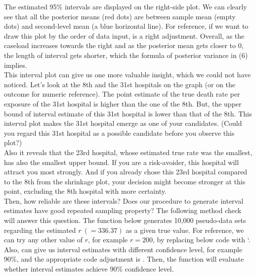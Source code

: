 \documentclass[article]{jss}
\begin{document}
The estimated 95\% intervals are displayed on the right-side plot. We can clearly see that all the posterior means (red dots) are between sample mean (empty dots) and second-level mean (a blue horizontal line). For reference, if we want to draw this plot by the order of data input,  is a right adjustment. Overall, as the caseload increases towards the right and as the posterior mean gets closer to 0, the length of interval gets shorter, which the formula of posterior variance in (6) implies. 
\\

This interval plot can give us one more valuable insight, which we could not have noticed. Let's look at the 8th and the 31st hospitals on the graph (or on the outcome for numeric reference). The point estimate of the true death rate per exposure of the 31st hospital is higher than the one of the 8th. But, the upper bound of interval estimate of this 31st hospital is lower than that of the 8th. This interval plot makes the 31st hospital emerge as one of your candidates. (Could you regard this 31st hospital as a possible candidate before you observe this plot?)
\\

Also it reveals that the 23rd hospital, whose estimated true rate was the smallest, has also the smallest upper bound. If you are a risk-avoider, this hospital will attract you most strongly. And if you already chose this 23rd hospital compared to the 8th from the shrinkage plot, your decision might become stronger at this point, excluding the 8th hospital with more certainty. 
\\

Then, how reliable are these intervals? Does our procedure to generate interval estimates have good repeated sampling property? The following method check will answer this question. The  function below generates 10,000 pseudo-data sets regarding the estimated $r~(=336.37)$ as a given true value. For reference, we can try any other value of $r$, for example $r=200$, by replacing below code with `.
\\

Also,  can give us interval estimates with different confidence level, for example 90\%,  and the appropriate code adjustment is .  Then, the function  will evaluate whether interval estimates achieve 90\% confidence level.
\\
\end{document}
